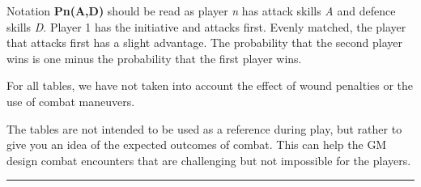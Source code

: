 Notation \textbf{Pn(A,D)} should be read as player \emph{n} has attack skills \emph{A} and defence skills \emph{D}. Player 1 has the initiative and attacks first. Evenly matched, the player that attacks first has a slight advantage. The probability that the second player wins is one minus the probability that the first player wins.

For all tables, we have not taken into account the effect of wound penalties or the use of combat maneuvers.

The tables are not intended to be used as a reference during play, but rather to give you an idea of the expected outcomes of combat. This can help the GM design combat encounters that are challenging but not impossible for the players.

\vspace{\baselineskip}
\hrule
